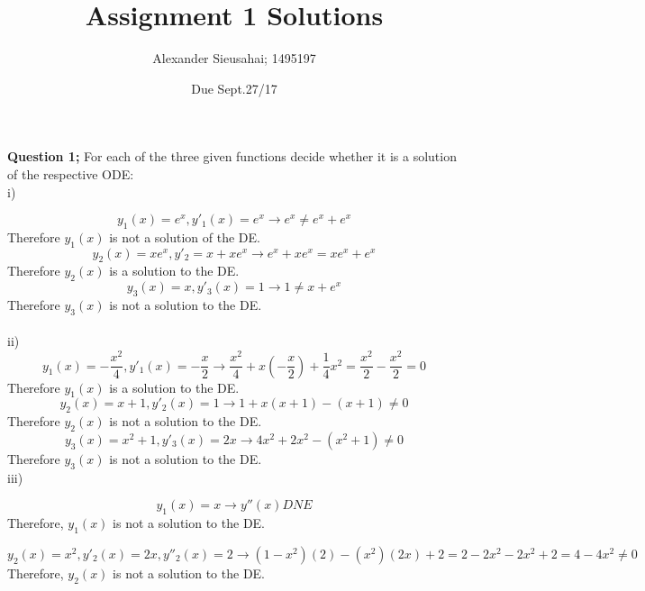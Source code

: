 \documentclass{article}
\author{Alexander Sieusahai; 1495197}
\date{Due Sept.27/17}
\title{Assignment 1 Solutions}
\begin{document}
\maketitle

\textbf{Question 1;} For each of the three given functions decide whether it is a solution of the respective ODE: \\

\tab i)

\[ y_1(x) = e^x, y'_1(x) = e^x \rightarrow e^x \neq e^x+e^x \]
Therefore $y_1(x)$ is not a solution of the DE.\\

\[y_2(x)=xe^x, y'_2=x+xe^x \rightarrow e^x+xe^x = xe^x+e^x \]
Therefore $y_2(x)$ is a solution to the DE.\\

\[y_3(x)=x, y'_3(x)=1 \rightarrow 1 \neq x+e^x \]
Therefore $y_3(x)$ is not a solution to the DE.\\
\\
\tab ii) 
\[ y_1(x)=-\frac{x^2}{4}, y'_1(x) = -\frac{x}{2} \rightarrow  \frac{x^2}{4}+x(-\frac{x}{2})+\frac{1}{4}x^2 = \frac{x^2}{2} - \frac{x^2}{2} = 0 \]
Therefore $y_1(x)$ is a solution to the DE.\\

\[y_2(x)=x+1, y'_2(x) = 1 \rightarrow 1 + x(x+1) -(x+1) \neq 0 \]
Therefore $y_2(x)$ is not a solution to the DE.\\

\[y_3(x)=x^2+1, y'_3(x)=2x \rightarrow 4x^2+2x^2-(x^2+1) \neq 0 \]
Therefore $y_3(x)$ is not a solution to the DE.\\

\tab iii)

\[y_1(x)=x \rightarrow y''(x) DNE \]
Therefore, $y_1(x)$ is not a solution to the DE.

\[y_2(x)=x^2, y'_2(x) = 2x, y''_2(x) = 2 \rightarrow (1-x^2)(2) - (x^2)(2x) + 2 =2-2x^2-2x^2+2 = 4-4x^2 \neq 0 \]
Therefore, $y_2(x)$ is not a solution to the DE.
\end{document}
